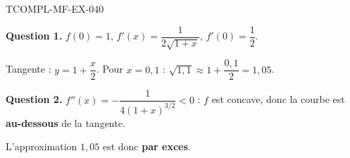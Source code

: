\begin{corrige}{TCOMPL-MF-EX-040}

\textbf{Question 1.} $f(0)=1$, $f'(x) = \dfrac{1}{2\sqrt{1+x}}$, $f'(0) = \dfrac{1}{2}$.


Tangente : $y = 1 + \dfrac{x}{2}$. Pour $x = 0{,}1$ : $\sqrt{1{,}1} \approx 1 + \dfrac{0{,}1}{2} = 1{,}05$.

\textbf{Question 2.} $f''(x) = -\dfrac{1}{4(1+x)^{3/2}} < 0$ : $f$ est concave, donc la courbe est \textbf{au-dessous} de la tangente.

L'approximation $1{,}05$ est donc \textbf{par exces}.

\end{corrige}
